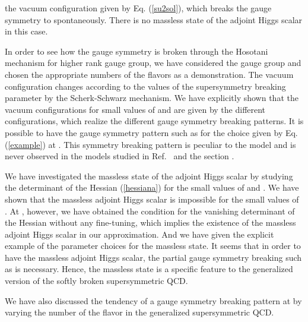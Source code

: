 \documentclass[a4paper,12pt]{article}
\begin{document}
{the vacuum configuration given by Eq. (\ref{su2sol}), which 
breaks the \coordHE{} gauge symmetry to \coordHE{} spontaneously. 
There is no massless state of the adjoint Higgs scalar in this case.
\par
In order to see how the gauge symmetry is broken through
the Hosotani mechanism for higher rank gauge group, we have 
considered the \coordHE{} gauge group and chosen the appropriate 
numbers of the flavors as a demonstration.
The vacuum configuration changes according to the values 
of the supersymmetry breaking parameter
\myHighlight{$\beta$}\coordHE{} by the Scherk-Schwarz mechanism. 
We have explicitly shown that the vacuum 
configurations for small values of \myHighlight{$\beta$}\coordHE{} and \myHighlight{$\beta=\pi$}\coordHE{} are given by
the different configurations, which realize the different gauge symmetry 
breaking patterns. It is possible to have the gauge 
symmetry pattern such as \coordHE{} for the choice 
given by Eq. (\ref{example}) at \myHighlight{$\beta=\pi$}\coordHE{}.
This symmetry breaking pattern is peculiar to the model and is never 
observed in the models studied 
in Ref.~\cite{takenagab} and the section \coordHE{}. 
\par
We have investigated the massless state of the adjoint Higgs scalar
by studying the determinant of the Hessian (\ref{hessiana}) for
the small values of \myHighlight{$\beta$}\coordHE{} and \myHighlight{$\beta=\pi$}\coordHE{}.
We have shown that the massless adjoint Higgs scalar is 
impossible for the small values of \myHighlight{$\beta$}\coordHE{}.
At \myHighlight{$\beta=\pi$}\coordHE{}, however, we have obtained the condition for 
the vanishing determinant of the Hessian without 
any fine-tuning, which implies
the existence of the massless adjoint Higgs scalar in our approximation.
And we have given the explicit example of the parameter choices 
for the massless state. It seems that in order to have the massless 
adjoint Higgs scalar, the partial gauge symmetry breaking 
such as \coordHE{} is necessary. Hence, the 
massless state is a specific feature to the 
generalized version of the softly broken supersymmetric QCD.
\par
We have also discussed the tendency of a gauge symmetry breaking pattern
at \myHighlight{$\beta=\pi$}\coordHE{} by varying the number of the flavor in 
the generalized supersymmetric QCD. 
}
\end{document}
